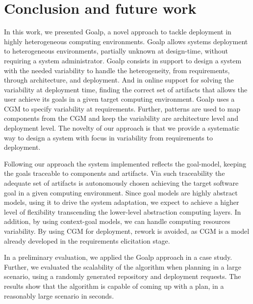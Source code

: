\section{Conclusion and future work}
\label{sec:conclusion}

In this work, we presented Goalp, a novel approach to tackle deployment in highly heterogeneous computing environments.
Goalp allows systems deployment to heterogeneous environments, partially unknown at design-time, without requiring a system administrator.
Goalp consists in support to design a system with the needed variability to handle the heterogeneity, from requirements, through architecture, and deployment.
And in online support for solving the variability at deployment time, finding the correct set of artifacts that allows the user achieve its goals in a given target computing environment. Goalp uses a CGM to specify variability at requirements. Further, patterns are used to map components from the CGM and keep the variability are architecture level and deployment level. The novelty of our approach is that we provide a systematic way to design a system with focus in variability from requirements to deployment.

Following our approach the system implemented reflects the goal-model, keeping the goals traceable to components and artifacts. Via such traceability the adequate set of artifacts is autonomously chosen achieving the target software goal in a given computing environment. Since goal models are highly abstract models, using it to drive the system adaptation, we expect to achieve a higher level of flexibility transcending the lower-level abstraction computing layers. In addition, by using context-goal models, we can handle computing resources variability. By using CGM for deployment, rework is avoided, as CGM is a model already developed in the requirements elicitation stage.

In a preliminary evaluation, we applied the Goalp approach in a case study. Further, we evaluated the scalability of the algorithm when planning in a large scenario, using a randomly generated repository and deployment requests. The results show that the algorithm is capable of coming up with a plan, in a reasonably large scenario in seconds.

